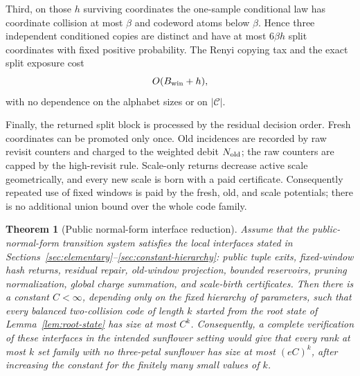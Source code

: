 \documentclass[11pt]{article}
\newtheorem{theorem}{Theorem}[section]
\newcommand{\C}{\mathcal C}
\begin{document}
Third, on those $h$ surviving coordinates the one-sample conditional law has
coordinate collision at most $\beta$ and codeword atoms below $\beta$.  Hence
three independent conditioned copies are distinct and have at most
$6\beta h$ split coordinates with fixed positive probability.  The Renyi
copying tax and the exact split exposure cost
\[
  O(B_{\rm win}+h),
\]
with no dependence on the alphabet sizes or on $|\C|$.

Finally, the returned split block is processed by the residual decision
order.  Fresh coordinates can be promoted only once.  Old incidences are
recorded by raw revisit counters and charged to the weighted debit
$N_{\rm old}$; the raw counters are capped by the high-revisit rule.  Scale-only
returns decrease active scale geometrically, and every new scale is born with
a paid certificate.  Consequently repeated use of fixed windows is paid by
the fresh, old, and scale potentials; there is no additional union bound over
the whole code family.

\begin{theorem}[Public normal-form interface reduction]
\label{thm:main-reduction}
Assume that the public-normal-form transition system satisfies the local
interfaces stated in Sections~\ref{sec:elementary}--\ref{sec:constant-hierarchy}:
public tuple exits, fixed-window hash returns, residual repair, old-window
projection, bounded reservoirs, pruning normalization, global charge summation,
and scale-birth certificates.  Then there is a constant $C<\infty$, depending
only on the fixed hierarchy of parameters, such that every balanced
two-collision code of length $k$ started from the root state of
Lemma~\ref{lem:root-state} has size at most $C^k$.
Consequently, a complete verification of these interfaces in the intended
sunflower setting would give that every rank at most $k$ set family with no
three-petal sunflower has size at most $(eC)^k$, after increasing the constant
for the finitely many small values of $k$.
\end{theorem}
\end{document}
